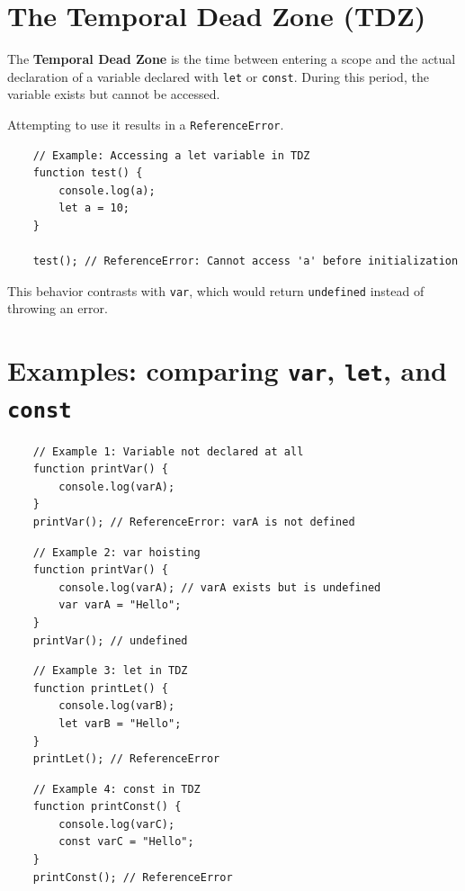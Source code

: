 \documentclass{scrbook}
\begin{document}
\section{The Temporal Dead Zone (TDZ)}

The \textbf{Temporal Dead Zone} is the time between entering a scope and the actual declaration of a variable declared with \texttt{let} or \texttt{const}. During this period, the variable exists but cannot be accessed.

Attempting to use it results in a \texttt{ReferenceError}.

\begin{lstlisting}
    // Example: Accessing a let variable in TDZ
    function test() {
        console.log(a);
        let a = 10;
    }

    test(); // ReferenceError: Cannot access 'a' before initialization
\end{lstlisting}

This behavior contrasts with \texttt{var}, which would return \texttt{undefined} instead of throwing an error.

\section{Examples: comparing \texttt{var}, \texttt{let}, and \texttt{const}}

\begin{lstlisting}
    // Example 1: Variable not declared at all
    function printVar() {
        console.log(varA);
    }
    printVar(); // ReferenceError: varA is not defined
\end{lstlisting}

\begin{lstlisting}
    // Example 2: var hoisting
    function printVar() {
        console.log(varA); // varA exists but is undefined
        var varA = "Hello";
    }
    printVar(); // undefined
\end{lstlisting}

\begin{lstlisting}
    // Example 3: let in TDZ
    function printLet() {
        console.log(varB);
        let varB = "Hello";
    }
    printLet(); // ReferenceError
\end{lstlisting}

\begin{lstlisting}
    // Example 4: const in TDZ
    function printConst() {
        console.log(varC);
        const varC = "Hello";
    }
    printConst(); // ReferenceError
\end{lstlisting}
\end{document}
